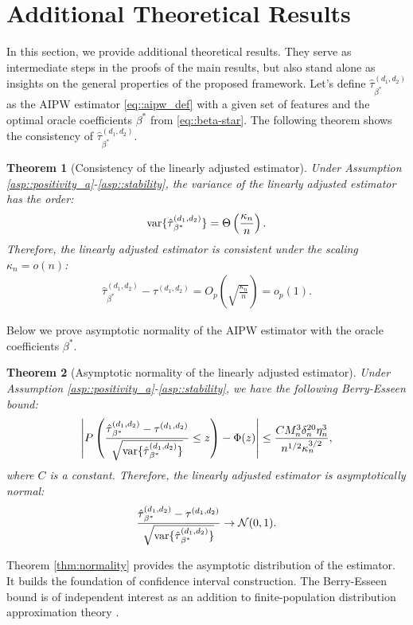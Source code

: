 \documentclass[twoside]{article}
\theoremstyle{plain}
\newtheorem{theorem}{Theorem}[section]
\theoremstyle{definition}
\theoremstyle{remark}
\newcommand{\var}{\textup{var}}
\newcommand{\cN}{\mathcal{N}}
\begin{document}
\section{Additional Theoretical Results}
In this section, we provide additional theoretical results. They serve as intermediate steps in the proofs of the main results, but also stand alone as insights on the general properties of the proposed framework. Let's define $\hat\tau{}^{(d_1, d_2)}_{\beta^*}$ as the AIPW estimator \eqref{eq::aipw_def} with a given set of features and the optimal oracle coefficients $\beta^*$ from \eqref{eq::beta-star}. The following theorem shows the consistency of $\hat\tau{}^{(d_1, d_2)}_{\beta^*}$.
\begin{theorem}[Consistency of the linearly adjusted estimator]\label{thm:consistency}
    Under Assumption \ref{asp::positivity_a}-\ref{asp::stability}, the variance of the linearly adjusted estimator has the order:
    \begin{eqnarray}\label{eq::variance_rate}
        \var\{\hat\tau{}^{(d_1, d_2)}_{\beta^*}\} = \Theta\left(\frac{\kappa_n}{n}\right).
    \end{eqnarray}
    Therefore, the linearly adjusted estimator is consistent under the scaling $\kappa_n = o(n)$:
    \begin{align*}
        \hat\tau{}^{(d_1, d_2)}_{\beta^*} - \tau^{(d_1, d_2)} = O_{p}\left(\sqrt{\frac{\kappa_n}{n}}\right) = o_p(1).
    \end{align*}
\end{theorem}

Below we prove asymptotic normality of the AIPW estimator with the oracle coefficients $\beta^*$.
\begin{theorem}[Asymptotic normality of the linearly adjusted estimator]\label{thm:normality-app}
    Under Assumption \ref{asp::positivity_a}-\ref{asp::stability}, we have the following Berry-Esseen bound:
    \begin{align*}
        \left|P\left(\frac{\hat\tau{}^{(d_1, d_2)}_{\beta^*} - \tau^{(d_1, d_2)}}{\sqrt{\var\{\hat\tau{}^{(d_1, d_2)}_{\beta^*}\}}} \leq z\right) - \Phi(z)\right| \leq \frac{C M_n^3 \delta_n^{20} \eta_n^3}{n^{1/2} \kappa_n^{3/2} },
    \end{align*}
    where $C$ is a constant. Therefore, the linearly adjusted estimator is asymptotically normal:
    \begin{align*}
       \frac{\hat\tau{}^{(d_1, d_2)}_{\beta^*} - \tau^{(d_1, d_2)}}{\sqrt{\var\{\hat\tau{}^{(d_1, d_2)}_{\beta^*}\}}} \rightarrow \cN(0, 1).
    \end{align*}
\end{theorem}
Theorem \ref{thm:normality} provides the asymptotic distribution of the estimator. It builds the foundation of confidence interval construction. The Berry-Esseen bound is of independent interest as an addition to finite-population distribution approximation theory \citep{shi2025berry,Masoero2026multiple}.
\end{document}

